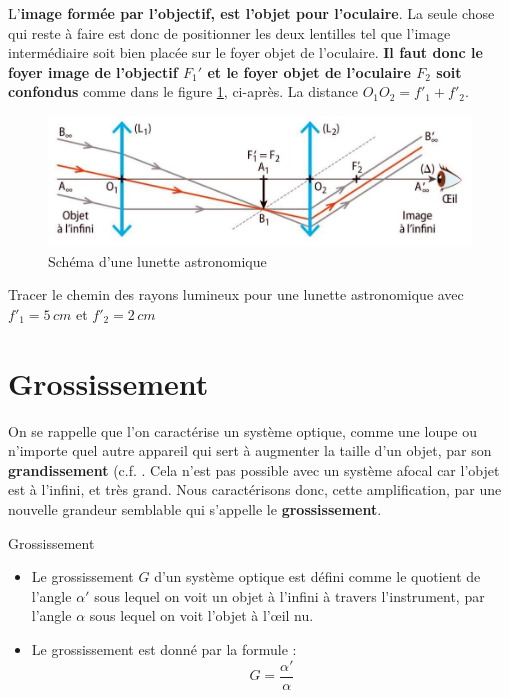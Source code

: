 \documentclass[11pt,a4paper]{article}
\begin{document}
L'\textbf{image formée par l'objectif, est l'objet pour l'oculaire}. La seule chose qui reste à faire est donc de positionner les deux lentilles tel que l'image intermédiaire soit bien placée sur le foyer objet de l'oculaire. \textbf{Il faut donc le foyer image de l'objectif $F_1'$ et le foyer objet de l'oculaire $F_2$ soit confondus} comme dans le figure \ref{fig:lunette}, ci-après. La distance $O_1O_2 = f'_1 + f'_2$.

\begin{figure}[H]
    \centering
    \includegraphics[width=.95\linewidth]{imgs/p6/lunette.jpg}
    \caption{Schéma d'une lunette astronomique}
    \label{fig:lunette}
\end{figure}

\begin{exo}
Tracer le chemin des rayons lumineux pour une lunette astronomique avec $f'_1 = 5\,cm$ et $f'_2 = 2\,cm$

\end{exo}

\section{Grossissement}
On se rappelle que l'on caractérise un système optique, comme une loupe ou n'importe quel autre appareil qui sert à augmenter la taille d'un objet, par son \textbf{grandissement} (c.f. . Cela n'est pas possible avec un système afocal car l'objet est à l'infini, et très grand. Nous caractérisons donc, cette amplification, par une nouvelle grandeur semblable qui s'appelle le \textbf{grossissement}. 

\begin{defn}{Grossissement}
\begin{itemize}
    \item Le grossissement $G$ d'un système optique est défini comme le quotient de l'angle $\alpha'$ sous lequel on voit un objet à l'infini à travers l'instrument, par l'angle $\alpha$ sous lequel on voit l'objet à l'\oe il nu. \item Le grossissement est donné par la formule : 
    \[  G = \frac{\alpha'}{\alpha}      \]
\end{itemize}
\end{defn}
\end{document}
